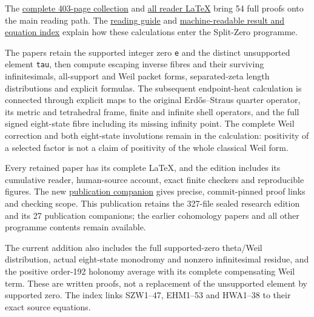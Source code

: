 \documentclass[
]{article}
\begin{document}
The
\href{https://github.com/KokunoYumeto/zeta-function-research-reader/blob/main/workbenches/splitzero-tandem/branches/tau-zero-prime-positivity/TAU_ZERO_PRIME_POSITIVITY.pdf}{complete
403-page collection} and
\href{https://github.com/KokunoYumeto/zeta-function-research-reader/blob/main/workbenches/splitzero-tandem/branches/tau-zero-prime-positivity/TAU_ZERO_PRIME_POSITIVITY.tex}{all
reader LaTeX} bring 54 full proofs onto the main reading path. The
\href{https://github.com/KokunoYumeto/zeta-function-research-reader/blob/main/workbenches/splitzero-tandem/branches/tau-zero-prime-positivity/README.md}{reading
guide} and
\href{https://github.com/KokunoYumeto/zeta-function-research-reader/blob/main/workbenches/splitzero-tandem/branches/tau-zero-prime-positivity/PUBLICATION_INDEX.json}{machine-readable
result and equation index} explain how these calculations enter the
Split-Zero programme.

The papers retain the supported integer zero \texttt{e} and the distinct
unsupported element \texttt{tau}, then compute escaping inverse fibres
and their surviving infinitesimals, all-support and Weil packet forms,
separated-zeta length distributions and explicit formulas. The
subsequent endpoint-heat calculation is connected through explicit maps
to the original Erdős--Straus quarter operator, its metric and
tetrahedral frame, finite and infinite shell operators, and the full
signed eight-state fibre including its missing infinity point. The
complete Weil correction and both eight-state involutions remain in the
calculation: positivity of a selected factor is not a claim of
positivity of the whole classical Weil form.

Every retained paper has its complete LaTeX, and the edition includes
its cumulative reader, human-source account, exact finite checkers and
reproducible figures. The new
\href{https://github.com/KokunoYumeto/zeta-function-research-reader/blob/main/workbenches/splitzero-tandem/branches/tau-zero-prime-positivity/PUBLICATION_COMPANION.md}{publication
companion} gives precise, commit-pinned proof links and checking scope.
This publication retains the 327-file sealed research edition and its 27
publication companions; the earlier cohomology papers and all other
programme contents remain available.

The current addition also includes the full supported-zero theta/Weil
distribution, actual eight-state monodromy and nonzero infinitesimal
residue, and the positive order-192 holonomy average with its complete
compensating Weil term. These are written proofs, not a replacement of
the unsupported element by supported zero. The index links SZW1--47,
EHM1--53 and HWA1--38 to their exact source equations.
\end{document}
